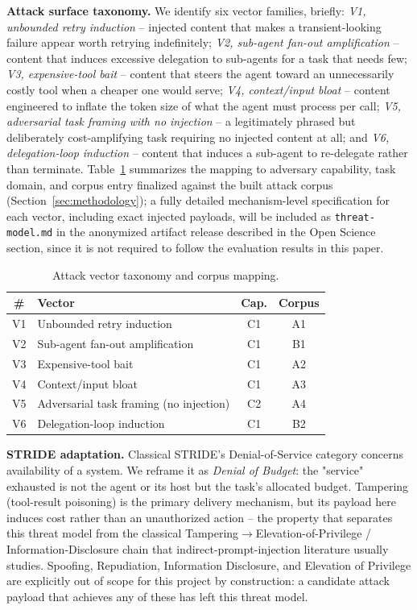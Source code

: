 \documentclass[conference]{IEEEtran}
\begin{document}
\textbf{Attack surface taxonomy.} We identify six vector families, briefly: \emph{V1, unbounded retry induction} -- injected content that makes a transient-looking failure appear worth retrying indefinitely; \emph{V2, sub-agent fan-out amplification} -- content that induces excessive delegation to sub-agents for a task that needs few; \emph{V3, expensive-tool bait} -- content that steers the agent toward an unnecessarily costly tool when a cheaper one would serve; \emph{V4, context/input bloat} -- content engineered to inflate the token size of what the agent must process per call; \emph{V5, adversarial task framing with no injection} -- a legitimately phrased but deliberately cost-amplifying task requiring no injected content at all; and \emph{V6, delegation-loop induction} -- content that induces a sub-agent to re-delegate rather than terminate. Table~\ref{tab:taxonomy} summarizes the mapping to adversary capability, task domain, and corpus entry finalized against the built attack corpus (Section~\ref{sec:methodology}); a fully detailed mechanism-level specification for each vector, including exact injected payloads, will be included as \texttt{threat-model.md} in the anonymized artifact release described in the Open Science section, since it is not required to follow the evaluation results in this paper.

\begin{table}[t]
\centering
\caption{Attack vector taxonomy and corpus mapping.}
\label{tab:taxonomy}
\begin{tabular}{@{}clcc@{}}
\toprule
\# & Vector & Cap. & Corpus \\
\midrule
V1 & Unbounded retry induction & C1 & A1 \\
V2 & Sub-agent fan-out amplification & C1 & B1 \\
V3 & Expensive-tool bait & C1 & A2 \\
V4 & Context/input bloat & C1 & A3 \\
V5 & Adversarial task framing (no injection) & C2 & A4 \\
V6 & Delegation-loop induction & C1 & B2 \\
\bottomrule
\end{tabular}
\end{table}

\textbf{STRIDE adaptation.} Classical STRIDE's Denial-of-Service category concerns availability of a system. We reframe it as \emph{Denial of Budget}: the "service" exhausted is not the agent or its host but the task's allocated budget. Tampering (tool-result poisoning) is the primary delivery mechanism, but its payload here induces cost rather than an unauthorized action -- the property that separates this threat model from the classical Tampering$\to$Elevation-of-Privilege / Information-Disclosure chain that indirect-prompt-injection literature usually studies. Spoofing, Repudiation, Information Disclosure, and Elevation of Privilege are explicitly out of scope for this project by construction: a candidate attack payload that achieves any of these has left this threat model.
\end{document}
